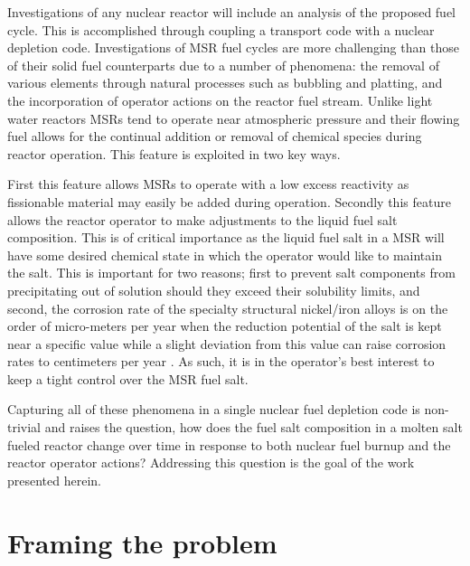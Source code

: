 Investigations of any nuclear reactor will include an analysis of the proposed
fuel cycle. This is accomplished through coupling a transport code with a
nuclear depletion code. Investigations of MSR fuel cycles are more challenging
than those of their solid fuel counterparts due to a number of phenomena: the
removal of various elements through natural processes such as bubbling and
platting, and the incorporation of operator actions on the reactor fuel stream.
Unlike light water reactors MSRs tend to operate near atmospheric pressure and
their flowing fuel allows for the continual addition or removal of chemical
species during reactor operation. This feature is exploited in two key ways.

First this feature allows MSRs to operate with a
low excess reactivity as fissionable material may easily be added during
operation. Secondly this feature allows the reactor operator to make adjustments
to the liquid fuel salt composition. This is of critical importance as the 
liquid fuel salt in a MSR will have some desired chemical state
in which the operator would like to maintain the salt. This is important for two
reasons; first to prevent salt components from precipitating out of solution
should they exceed their solubility limits, and second, the corrosion rate of 
the specialty structural nickel/iron alloys is on the order of
micro-meters per year when the reduction potential of the salt is kept near
a specific value while a slight deviation from this value can raise corrosion
rates to centimeters per year \cite{Corrosion}. 
As such, it is in the operator's best interest to keep a tight control over 
the MSR fuel salt.

Capturing all of these phenomena in a single nuclear fuel depletion code is
non-trivial and raises the question, how does the fuel salt composition in a 
molten salt fueled reactor change over time in response to both nuclear fuel
burnup and the reactor operator actions? Addressing this question is the goal
of the work presented herein. 

\section{Framing the problem}

